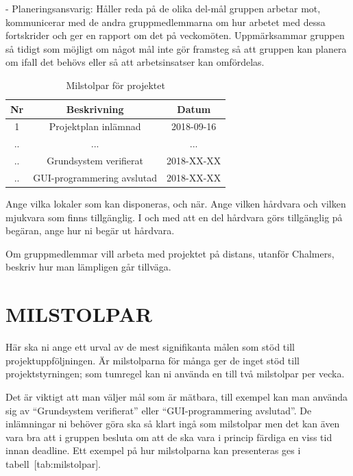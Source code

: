 \documentclass[a4paper]{article}
\begin{document}
-   Planeringsansvarig: Håller reda på de olika del-mål gruppen arbetar
    mot, kommunicerar med de andra gruppmedlemmarna om hur arbetet med
    dessa fortskrider och ger en rapport om det på veckomöten.
    Uppmärksammar gruppen så tidigt som möjligt om något mål inte gör
    framsteg så att gruppen kan planera om ifall det behövs eller så att
    arbetsinsatser kan omfördelas.
    
\begin{table}
\begin{center}
\begin{tabular}{ |c|c|c| }
 \hline
 Nr & Beskrivning & Datum \\ 
 \hline
 \hline
 1 & Projektplan inlämnad & 2018-09-16 \\ 
 \hline
 .. & ... & ... \\ 
 \hline
 .. & Grundsystem verifierat & 2018-XX-XX \\ 
 \hline
 .. & GUI-programmering avslutad & 2018-XX-XX \\
 \hline
\end{tabular}
\caption{Milstolpar för projektet}
\label{tabellnamnförreferens}
\end{center}
\end{table}
Ange vilka lokaler som kan disponeras, och när. Ange vilken hårdvara och
vilken mjukvara som finns tillgänglig. I och med att en del hårdvara
görs tillgänglig på begäran, ange hur ni begär ut hårdvara.

Om gruppmedlemmar vill arbeta med projektet på distans, utanför
Chalmers, beskriv hur man lämpligen går tillväga.



\section{MILSTOLPAR}


Här ska ni ange ett urval av de mest signifikanta målen som stöd till
projektuppföljningen. Är milstolparna för många ger de inget stöd till
projektstyrningen; som tumregel kan ni använda en till två milstolpar
per vecka.

Det är viktigt att man väljer mål som är mätbara, till exempel kan man
använda sig av “Grundsystem verifierat” eller “GUI-programmering
avslutad”. De inlämningar ni behöver göra ska så klart ingå som
milstolpar men det kan även vara bra att i gruppen besluta om att de ska
vara i princip färdiga en viss tid innan deadline. Ett exempel på hur
milstolparna kan presenteras ges i tabell [tab:milstolpar].
\end{document}
